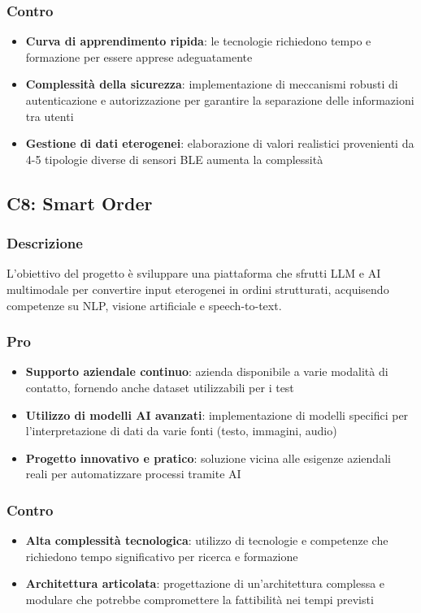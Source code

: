 \documentclass[11pt,a4paper]{article}
\begin{document}
\subsubsection{Contro}
\begin{itemize}
    \item \textbf{Curva di apprendimento ripida}: le tecnologie richiedono tempo e formazione per essere apprese adeguatamente
    \item \textbf{Complessità della sicurezza}: implementazione di meccanismi robusti di autenticazione e autorizzazione per garantire la separazione delle informazioni tra utenti
    \item \textbf{Gestione di dati eterogenei}: elaborazione di valori realistici provenienti da 4-5 tipologie diverse di sensori BLE aumenta la complessità
\end{itemize}

\vspace{0.5cm}
\subsection{C8: Smart Order}

\subsubsection{Descrizione}
L'obiettivo del progetto è sviluppare una piattaforma che sfrutti LLM e AI multimodale per convertire input eterogenei in ordini strutturati, acquisendo competenze su NLP, visione artificiale e speech-to-text.

\subsubsection{Pro}
\begin{itemize}
    \item \textbf{Supporto aziendale continuo}: azienda disponibile a varie modalità di contatto, fornendo anche dataset utilizzabili per i test
    \item \textbf{Utilizzo di modelli AI avanzati}: implementazione di modelli specifici per l'interpretazione di dati da varie fonti (testo, immagini, audio)
    \item \textbf{Progetto innovativo e pratico}: soluzione vicina alle esigenze aziendali reali per automatizzare processi tramite AI
\end{itemize}

\subsubsection{Contro}
\begin{itemize}
    \item \textbf{Alta complessità tecnologica}: utilizzo di tecnologie e competenze che richiedono tempo significativo per ricerca e formazione
    \item \textbf{Architettura articolata}: progettazione di un'architettura complessa e modulare che potrebbe compromettere la fattibilità nei tempi previsti
\end{itemize}
\end{document}
